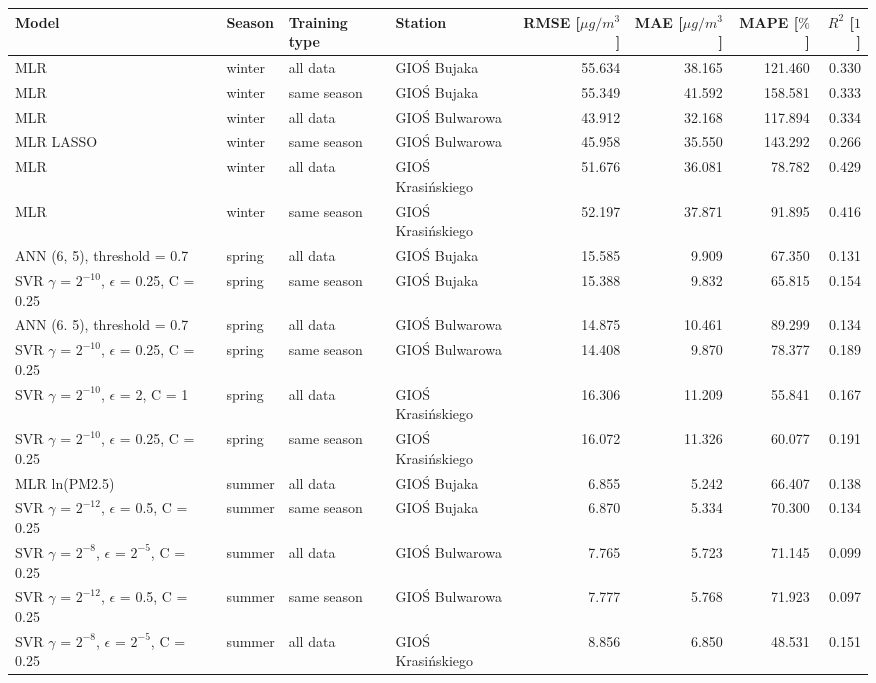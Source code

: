 \begin{landscape}
\begin{table}[ht]
\begin{tabular}{llllrrrr}
\toprule
Model & Season & Training type & Station & RMSE [$\mu g/m^3$] & MAE [$\mu g/m^3$] & MAPE [$\%$] & $R^2$ [$1$] \\ \midrule
MLR & winter & all data & GIOŚ Bujaka & 55.634 & 38.165 & 121.460 & 0.330 \\
MLR & winter & same season & GIOŚ Bujaka & 55.349 & 41.592 & 158.581 & 0.333 \\
MLR & winter & all data & GIOŚ Bulwarowa & 43.912 & 32.168 & 117.894 & 0.334 \\
MLR LASSO & winter & same season & GIOŚ Bulwarowa & 45.958 & 35.550 & 143.292 & 0.266 \\
MLR & winter & all data & GIOŚ Krasińskiego & 51.676 & 36.081 & 78.782 & 0.429 \\
MLR & winter & same season & GIOŚ Krasińskiego & 52.197 & 37.871 & 91.895 & 0.416 \\
\midrule
ANN (6, 5), threshold = 0.7 & spring & all data & GIOŚ Bujaka & 15.585 & 9.909 & 67.350 & 0.131 \\
SVR $\gamma$ = $2^{-10}$, $\epsilon$ = 0.25, C = 0.25 & spring & same season & GIOŚ Bujaka & 15.388 & 9.832 & 65.815 & 0.154 \\
ANN (6. 5), threshold = 0.7 & spring & all data & GIOŚ Bulwarowa & 14.875 & 10.461 & 89.299 & 0.134 \\
SVR $\gamma$ = $2^{-10}$, $\epsilon$ = 0.25, C = 0.25 & spring & same season & GIOŚ Bulwarowa & 14.408 & 9.870 & 78.377 & 0.189 \\
SVR $\gamma$ = $2^{-10}$, $\epsilon$ = 2, C = 1 & spring & all data & GIOŚ Krasińskiego & 16.306 & 11.209 & 55.841 & 0.167 \\
SVR $\gamma$ = $2^{-10}$, $\epsilon$ = 0.25, C = 0.25 & spring & same season & GIOŚ Krasińskiego & 16.072 & 11.326 & 60.077 & 0.191 \\
\midrule
MLR ln(PM2.5) & summer & all data & GIOŚ Bujaka & 6.855 & 5.242 & 66.407 & 0.138 \\
SVR $\gamma$ = $2^{-12}$, $\epsilon$ = 0.5, C = 0.25 & summer & same season & GIOŚ Bujaka & 6.870 & 5.334 & 70.300 & 0.134 \\
SVR $\gamma$ = $2^{-8}$, $\epsilon$ = $2^{-5}$, C = 0.25 & summer & all data & GIOŚ Bulwarowa & 7.765 & 5.723 & 71.145 & 0.099 \\
SVR $\gamma$ = $2^{-12}$, $\epsilon$ = 0.5, C = 0.25 & summer & same season & GIOŚ Bulwarowa & 7.777 & 5.768 & 71.923 & 0.097 \\
SVR $\gamma$ = $2^{-8}$, $\epsilon$ = $2^{-5}$, C = 0.25 & summer & all data & GIOŚ Krasińskiego & 8.856 & 6.850 & 48.531 & 0.151 \\

\end{tabular}
\end{table}
\end{landscape}
